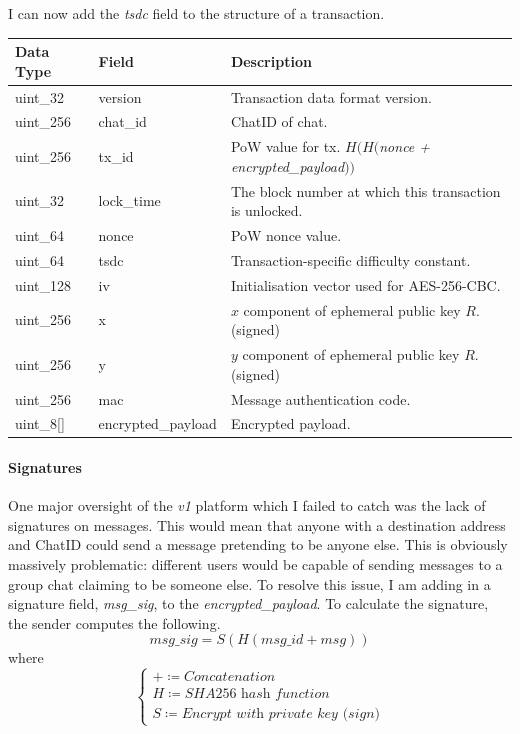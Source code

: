 \documentclass{article}
\begin{document}
I can now add the \textit{tsdc} field to the structure of a transaction.
\begin{table}[H]
\centering
\begin{tabular}{|p{1.3cm}|p{3cm}|p{5.5cm}|}
\hline
\rowcolor{tblgrey}
Data Type   & Field       & Description\\ \hline
uint\_32    & version     & Transaction data format version.                          \\ \hline
uint\_256   & chat\_id    & ChatID of chat. \\ \hline
uint\_256   & tx\_id      & PoW value for tx. $H(H($\textit{nonce + encrypted\_payload}$))$ \\ \hline
uint\_32    & lock\_time  & The block number at which this transaction is unlocked. \\ \hline
uint\_64    & nonce       & PoW nonce value. \\ \hline
uint\_64    & tsdc        & Transaction-specific difficulty constant.  \\ \hline
uint\_128   & iv          & Initialisation vector used for AES-256-CBC.   \\ \hline
uint\_256   & x           & $x$ component of ephemeral public key $R$. (signed)    \\ \hline
uint\_256   & y           & $y$ component of ephemeral public key $R$. (signed)    \\ \hline
uint\_256   & mac         & Message authentication code. \\ \hline
uint\_8[\hspace{0.05cm}]  & encrypted\_payload & Encrypted payload. \\ \hline
\end{tabular}
\end{table}

\paragraph{Signatures}
One major oversight of the \textit{v1} platform which I failed to catch was the lack of signatures on messages. This would mean that anyone with a destination address and ChatID could send a message pretending to be anyone else. This is obviously massively problematic: different users would be capable of sending messages to a group chat claiming to be someone else. To resolve this issue, I am adding in a signature field, \textit{msg\_sig}, to the \textit{encrypted\_payload}. To calculate the signature, the sender computes the following.
\[ \textit{msg\_sig} = S(H(\textit{msg\_id} + \textit{msg})) \]
where
\[
\begin{cases}
    + \coloneqq \textit{Concatenation} \\[6pt]
    H \coloneqq \textit{SHA256 hash function} \\[6pt]
    S \coloneqq \textit{Encrypt with private key (sign)}
\end{cases}
\]
\end{document}
